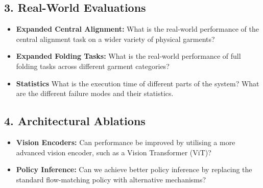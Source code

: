\documentclass[journal]{IEEEtran}
\begin{document}
\subsection*{3. Real-World Evaluations}
\begin{itemize}
    \item \textbf{Expanded Central Alignment:} What is the real-world performance of the central alignment task on a wider variety of physical garments?
    \item \textbf{Expanded Folding Tasks:} What is the real-world performance of full folding tasks across different garment categories?
    \item \textbf{Statistics} What is the execution time of different parts of the system? What are the different failure modes and their statistics.
\end{itemize}

\subsection*{4. Architectural Ablations}
\begin{itemize}
    \item \textbf{Vision Encoders:} Can performance be improved by utilising a more advanced vision encoder, such as a Vision Transformer (ViT)?
    \item \textbf{Policy Inference:} Can we achieve better policy inference by replacing the standard flow-matching policy with alternative mechanisms?
\end{itemize}
\end{document}
